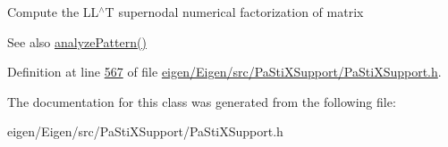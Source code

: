 Compute the L\+L$^\wedge$T supernodal numerical factorization of {\ttfamily matrix} \begin{DoxySeeAlso}{See also}
\hyperlink{class_eigen_1_1_pastix_l_l_t_a671e8444ae2f04db3565e35caa958667}{analyze\+Pattern()} 
\end{DoxySeeAlso}


Definition at line \hyperlink{eigen_2_eigen_2src_2_pa_sti_x_support_2_pa_sti_x_support_8h_source_l00567}{567} of file \hyperlink{eigen_2_eigen_2src_2_pa_sti_x_support_2_pa_sti_x_support_8h_source}{eigen/\+Eigen/src/\+Pa\+Sti\+X\+Support/\+Pa\+Sti\+X\+Support.\+h}.



The documentation for this class was generated from the following file\+:\begin{DoxyCompactItemize}
\item 
eigen/\+Eigen/src/\+Pa\+Sti\+X\+Support/\+Pa\+Sti\+X\+Support.\+h\end{DoxyCompactItemize}
